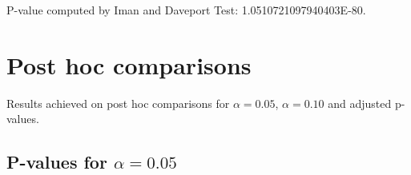 \documentclass[a4paper,10pt]{article}
\begin{document}
\begin{landscape}
P-value computed by Iman and Daveport Test: 1.0510721097940403E-80.\newline



\pagebreak

\section{Post hoc comparisons}

Results achieved on post hoc comparisons for $\alpha = 0.05$, $\alpha = 0.10$ and adjusted p-values.

\subsection{P-values for $\alpha=0.05$}


\end{landscape}
\end{document}
